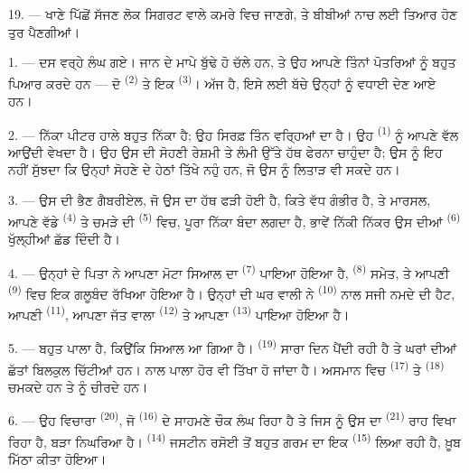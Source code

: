 19. --- ਖਾਣੇ ਪਿੱਛੋਂ ਸੱਜਣ ਲੋਕ ਸਿਗਰਟ ਵਾਲੇ ਕਮਰੇ ਵਿਚ ਜਾਣਗੇ, ਤੇ ਬੀਬੀਆਂ ਨਾਚ ਲਈ
ਤਿਆਰ ਹੋਣ ਤੁਰ ਪੈਣਗੀਆਂ।

\VUsaut{5.0mm}
\VUsaut{1.6mm}
\VUsaut{2.6mm}

\VUsaut{3.0mm}

1. --- ਦਸ ਵਰ੍ਹੇ ਲੰਘ ਗਏ। ਜਾਨ ਦੇ ਮਾਪੇ ਬੁੱਢੇ ਹੋ ਚੱਲੇ ਹਨ, ਤੇ ਉਹ ਆਪਣੇ ਤਿੰਨਾਂ
ਪੋਤਰਿਆਂ ਨੂੰ ਬਹੁਤ ਪਿਆਰ ਕਰਦੇ ਹਨ — ਦੋ  \textsuperscript{(2)} ਤੇ ਇਕ
 \textsuperscript{(3)}। ਅੱਜ  ਹੈ, ਇਸੇ ਲਈ
ਬੱਚੇ ਉਨ੍ਹਾਂ ਨੂੰ ਵਧਾਈ ਦੇਣ ਆਏ ਹਨ।

2. --- ਨਿੱਕਾ ਪੀਟਰ ਹਾਲੇ ਬਹੁਤ ਨਿੱਕਾ ਹੈ; ਉਹ ਸਿਰਫ਼ ਤਿੰਨ ਵਰ੍ਹਿਆਂ ਦਾ ਹੈ। ਉਹ
 \textsuperscript{(1)} ਨੂੰ ਆਪਣੇ ਵੱਲ ਆਉਂਦੀ ਵੇਖਦਾ ਹੈ। ਉਹ ਉਸ ਦੀ ਸੋਹਣੀ
ਰੇਸ਼ਮੀ  ਤੇ ਲੰਮੀ  ਉੱਤੇ ਹੱਥ ਫੇਰਨਾ ਚਾਹੁੰਦਾ ਹੈ; ਉਸ ਨੂੰ ਇਹ
ਨਹੀਂ ਸੁੱਝਦਾ ਕਿ ਉਨ੍ਹਾਂ ਸੋਹਣੇ  ਦੇ ਹੇਠਾਂ ਤਿੱਖੇ ਨਹੁੰ ਹਨ, ਜੋ ਉਸ ਨੂੰ
ਲਿਤਾੜ ਵੀ ਸਕਦੇ ਹਨ।

3. --- ਉਸ ਦੀ ਭੈਣ ਗੈਬਰੀਏਲ, ਜੋ ਉਸ ਦਾ ਹੱਥ ਫੜੀ ਹੋਈ ਹੈ, ਕਿਤੇ ਵੱਧ ਗੰਭੀਰ ਹੈ, ਤੇ
ਮਾਰਸਲ, ਆਪਣੇ ਵੱਡੇ  \textsuperscript{(4)} ਤੇ ਚਮੜੇ ਦੀ 
\textsuperscript{(5)} ਵਿਚ, ਪੂਰਾ ਨਿੱਕਾ ਬੰਦਾ ਲਗਦਾ ਹੈ, ਭਾਵੇਂ ਨਿੱਕੀ ਨਿੱਕਰ ਉਸ ਦੀਆਂ
 \textsuperscript{(6)} ਖੁੱਲ੍ਹੀਆਂ ਛੱਡ ਦਿੰਦੀ ਹੈ।

4. --- ਉਨ੍ਹਾਂ ਦੇ ਪਿਤਾ ਨੇ ਆਪਣਾ ਮੋਟਾ ਸਿਆਲ ਦਾ 
\textsuperscript{(7)} ਪਾਇਆ ਹੋਇਆ ਹੈ,  \textsuperscript{(8)}
ਸਮੇਤ, ਤੇ ਆਪਣੀ  \textsuperscript{(9)} ਵਿਚ ਇਕ ਗਲੂਬੰਦ ਰੱਖਿਆ ਹੋਇਆ ਹੈ।
ਉਨ੍ਹਾਂ ਦੀ ਘਰ ਵਾਲੀ ਨੇ  \textsuperscript{(10)} ਨਾਲ ਸਜੀ ਨਮਦੇ ਦੀ ਹੈਟ,
ਆਪਣੀ  \textsuperscript{(11)}, ਆਪਣਾ ਜੱਤ ਵਾਲਾ 
\textsuperscript{(12)} ਤੇ ਆਪਣਾ  \textsuperscript{(13)} ਪਾਇਆ ਹੋਇਆ ਹੈ।

5. --- ਬਹੁਤ ਪਾਲਾ ਹੈ, ਕਿਉਂਕਿ ਸਿਆਲ ਆ ਗਿਆ ਹੈ।  \textsuperscript{(19)}
ਸਾਰਾ ਦਿਨ ਪੈਂਦੀ ਰਹੀ ਹੈ ਤੇ ਘਰਾਂ ਦੀਆਂ ਛੱਤਾਂ ਬਿਲਕੁਲ ਚਿੱਟੀਆਂ ਹਨ।  ਨਾਲ
ਪਾਲਾ ਹੋਰ ਵੀ ਤਿੱਖਾ ਹੋ ਜਾਂਦਾ ਹੈ। ਅਸਮਾਨ ਵਿਚ  \textsuperscript{(17)} ਤੇ
 \textsuperscript{(18)} ਚਮਕਦੇ ਹਨ ਤੇ  ਨੂੰ ਚੀਰਦੇ ਹਨ।

\VUsaut{4.2mm}
\VUsaut{3.0mm}

6. --- ਉਹ ਵਿਚਾਰਾ  \textsuperscript{(20)}, ਜੋ 
\textsuperscript{(16)} ਦੇ ਸਾਹਮਣੇ ਚੌਕ ਲੰਘ ਰਿਹਾ ਹੈ ਤੇ ਜਿਸ ਨੂੰ ਉਸ ਦਾ
 \textsuperscript{(21)} ਰਾਹ ਵਿਖਾ ਰਿਹਾ ਹੈ, ਬੜਾ ਨਿਘਰਿਆ ਹੈ।
 \textsuperscript{(14)} ਜਸਟੀਨ ਰਸੋਈ ਤੋਂ ਬਹੁਤ ਗਰਮ 
ਦਾ ਇਕ  \textsuperscript{(15)} ਲਿਆ ਰਹੀ ਹੈ, ਖ਼ੂਬ ਮਿੱਠਾ ਕੀਤਾ ਹੋਇਆ।


